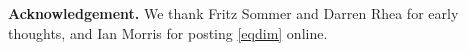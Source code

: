 \documentclass[journal, twocolumn]{IEEEtran}
\begin{document}
\textbf{Acknowledgement.} We thank Fritz Sommer and Darren Rhea for early thoughts, and Ian Morris for posting \eqref{eqdim} online.


%
\end{document}
